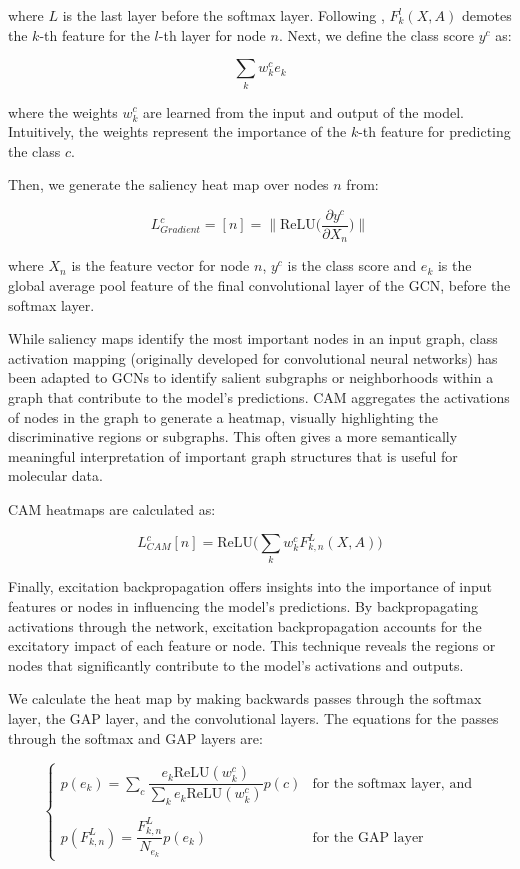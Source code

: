 \documentclass[final]{article}
\begin{document}
where $L$ is the last layer before the softmax layer. Following \cite{8954227}, $F_k^l (X, A)$ demotes the $k$-th feature for the $l$-th layer for node $n$. Next, we define the class score  $y^c$ as:

$$\sum_k w_k^ce_k$$

where the weights $w_k^c$ are learned from the input and output of the model. Intuitively, the weights represent the importance of the $k$-th feature for predicting the class $c$. 

Then, we generate the saliency heat map over nodes $n$ from:

$$L^c_{Gradient} = [n] = \|\text{ReLU} \bigg(\frac{\partial y^c}{\partial X_n}\bigg)\|$$

where $X_n$ is the feature vector for node $n$, $y^c$ is the class score and $e_k$ is the global average pool feature of the final convolutional layer of the GCN, before the softmax layer.

While saliency maps identify the most important nodes in an input graph, class activation mapping (originally developed for convolutional neural networks) has been adapted to GCNs to identify salient subgraphs or neighborhoods within a graph that contribute to the model's predictions. CAM aggregates the activations of nodes in the graph to generate a heatmap, visually highlighting the discriminative regions or subgraphs. This often gives a more semantically meaningful interpretation of important graph structures that is useful for molecular data. 

CAM heatmaps are calculated as:

$$L_{CAM}^c[n] = \text{ReLU} \bigg(\sum_k w_k^c F_{k, n}^L(X, A)\bigg)$$

Finally, excitation backpropagation offers insights into the importance of input features or nodes in influencing the model's predictions. By backpropagating activations through the network, excitation backpropagation accounts for the excitatory impact of each feature or node. This technique reveals the regions or nodes that significantly contribute to the model's activations and outputs. 

We calculate the heat map by making backwards passes through the softmax layer, the GAP layer, and the convolutional layers. The equations for the passes through the softmax and GAP layers are: 

$$\begin{cases}
    p(e_k) = \displaystyle \sum_c \dfrac{e_k \text{ReLU}(w_k^c)}{\sum_k e_k \text{ReLU}(w_k^c)}p(c) & \text{for the softmax layer, and}\\
     \\
    p(F^L_{k, n}) = \dfrac{F^L_{k, n}}{N_{e_k}}p(e_k) & \text{for the GAP layer}
\end{cases}$$
\end{document}
